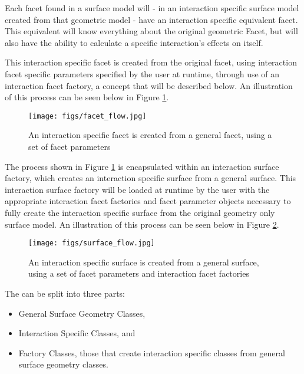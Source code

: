 Each facet found in a surface model will - in an interaction specific
surface model created from that geometric model - have an interaction
specific equivalent facet. This equivalent will know everything about
the original geometric Facet, but will also have the ability to
calculate a specific interaction's effects on itself.

This interaction specific facet is created from the original facet,
using interaction facet specific parameters specified by the
user at runtime, through use of an interaction facet factory,
a concept that will be described below.
An illustration of this process can be seen below in Figure
\ref{fig:facet_flow}.

\begin{figure}[H]
\begin{center}
\texttt{[image: figs/facet\_flow.jpg]}
\caption{An interaction specific facet is created from a general facet,
using a set of facet parameters}
\label{fig:facet_flow}
\end{center}
\end{figure}

The process shown in Figure \ref{fig:facet_flow} is encapsulated within
an interaction surface factory, which creates an interaction
specific surface from a general surface. This interaction surface factory
will be loaded  at runtime by the user with the
appropriate interaction facet factories and facet parameter objects
necessary to fully create the interaction specific surface
from the original geometry only surface model. An illustration of
this process can be seen below in Figure \ref{fig:surface_flow}.

\begin{figure}[H]
\begin{center}
\texttt{[image: figs/surface\_flow.jpg]}
\caption{An interaction specific surface is created from a general surface,
using a set of facet parameters and interaction facet factories}
\label{fig:surface_flow}
\end{center}
\end{figure}

The \ModelDesc can be split into three parts:

\begin{itemize}
\item{General Surface Geometry Classes},
\item{Interaction Specific Classes}, and
\item{Factory Classes}, those that create interaction specific classes from
general surface geometry classes.
\end{itemize}

